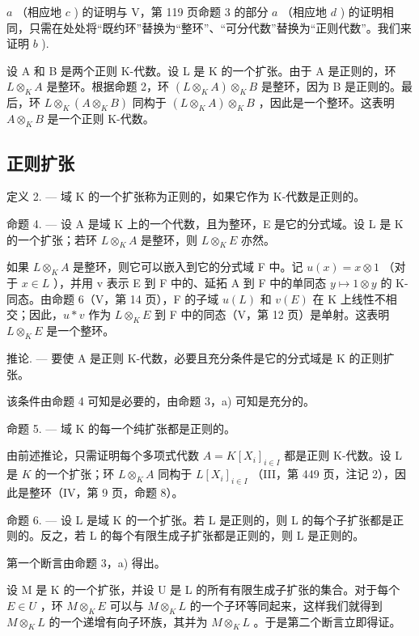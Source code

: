 \(a\) （相应地 \(c\) ) 的证明与 V，第 119 页命题 3 的部分 \(a\) （相应地 \(d\) ) 的证明相同，只需在处处将“既约环”替换为“整环”、“可分代数”替换为“正则代数”。我们来证明 \(b\) ).

设 A 和 B 是两个正则 K-代数。设 L 是 K 的一个扩张。由于 A 是正则的，环 \(L \otimes_{K} A\) 是整环。根据命题 2，环 \((L \otimes_{K} A) \otimes_{K} B\) 是整环，因为 B 是正则的。最后，环 \(L \otimes_{K} (A \otimes_{K} B)\) 同构于 \((L \otimes_{K} A) \otimes_{K} B\) ，因此是一个整环。这表明 \(A \otimes_{K} B\) 是一个正则 K-代数。

\subsection{正则扩张}

定义 2. --- 域 K 的一个扩张称为正则的，如果它作为 K-代数是正则的。

命题 4. --- 设 A 是域 K 上的一个代数，且为整环，E 是它的分式域。设 L 是 K 的一个扩张；若环 \(L \otimes_{K} A\) 是整环，则 \(L \otimes_{K} E\) 亦然。

如果 \(L \otimes_{K} A\) 是整环，则它可以嵌入到它的分式域 F 中。记 \(u(x) = x \otimes 1\) （对于 \(x \in L\) ），并用 v 表示 E 到 F 中的、延拓 A 到 F 中的单同态 \(y \mapsto 1 \otimes y\) 的 K-同态。由命题 6（V，第 14 页），F 的子域 \(u(L)\) 和 \(v(E)\) 在 K 上线性不相交；因此，\(u * v\) 作为 \(L \otimes_{K} E\) 到 F 中的同态（V，第 12 页）是单射。这表明 \(L \otimes_{K} E\) 是一个整环。

推论. --- 要使 A 是正则 K-代数，必要且充分条件是它的分式域是 K 的正则扩张。

该条件由命题 4 可知是必要的，由命题 3，a) 可知是充分的。

命题 5. --- 域 K 的每一个纯扩张都是正则的。

由前述推论，只需证明每个多项式代数 \(A = K[X_{i}]_{i \in I}\) 都是正则 K-代数。设 L 是 \(K\) 的一个扩张；环 \(L \otimes_{K} A\) 同构于 \(L[X_{i}]_{i \in I}\) （III，第 449 页，注记 2），因此是整环（IV，第 9 页，命题 8）。

命题 6. --- 设 L 是域 K 的一个扩张。若 L 是正则的，则 L 的每个子扩张都是正则的。反之，若 L 的每个有限生成子扩张都是正则的，则 L 是正则的。

第一个断言由命题 3，a) 得出。

设 M 是 K 的一个扩张，并设 U 是 L 的所有有限生成子扩张的集合。对于每个 \(E \in U\) ，环 \(M \otimes_{K} E\) 可以与 \(M \otimes_{K} L\) 的一个子环等同起来，这样我们就得到 \(M \otimes_{K} L\) 的一个递增有向子环族，其并为 \(M \otimes_{K} L\) 。于是第二个断言立即得证。

